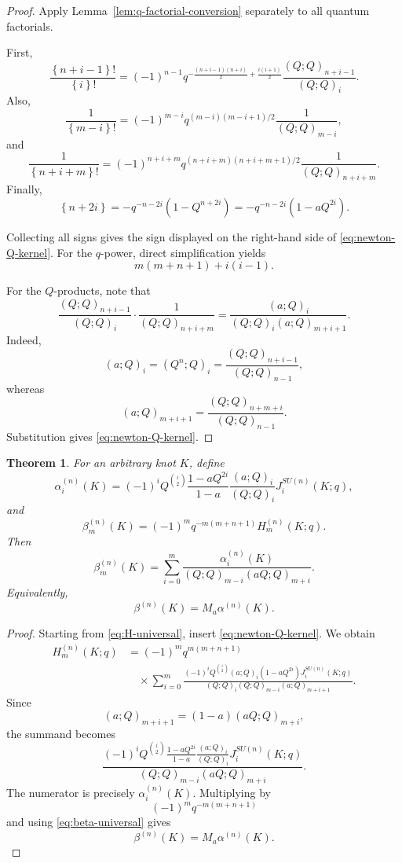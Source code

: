 \documentclass[11pt]{amsart}
\newtheorem{theorem}{Theorem}[section]
\newcommand{\curly}[1]{\left\{#1\right\}}
\begin{document}
\begin{proof}
Apply Lemma~\ref{lem:q-factorial-conversion} separately to all
quantum factorials.

First,
\[
\frac{\curly{n+i-1}!}{\curly{i}!}
=
(-1)^{n-1}
q^{-\frac{(n+i-1)(n+i)}2+\frac{i(i+1)}2}
\frac{(Q;Q)_{n+i-1}}{(Q;Q)_i}.
\]
Also,
\[
\frac{1}{\curly{m-i}!}
=
(-1)^{m-i}
q^{(m-i)(m-i+1)/2}
\frac{1}{(Q;Q)_{m-i}},
\]
and
\[
\frac{1}{\curly{n+i+m}!}
=
(-1)^{n+i+m}
q^{(n+i+m)(n+i+m+1)/2}
\frac{1}{(Q;Q)_{n+i+m}}.
\]
Finally,
\[
\curly{n+2i}
=
-q^{-n-2i}(1-Q^{n+2i})
=
-q^{-n-2i}(1-aQ^{2i}).
\]

Collecting all signs gives the sign displayed on the right-hand side
of \eqref{eq:newton-Q-kernel}.
For the \(q\)-power, direct simplification yields
\[
m(m+n+1)+i(i-1).
\]

For the \(Q\)-products, note that
\[
\frac{(Q;Q)_{n+i-1}}{(Q;Q)_i}
\cdot
\frac{1}{(Q;Q)_{n+i+m}}
=
\frac{(a;Q)_i}{
(Q;Q)_i(a;Q)_{m+i+1}
}.
\]
Indeed,
\[
(a;Q)_i
=
(Q^n;Q)_i
=
\frac{(Q;Q)_{n+i-1}}{(Q;Q)_{n-1}},
\]
whereas
\[
(a;Q)_{m+i+1}
=
\frac{(Q;Q)_{n+m+i}}{(Q;Q)_{n-1}}.
\]
Substitution gives \eqref{eq:newton-Q-kernel}.
\end{proof}

\begin{theorem}\label{thm:universal-bailey}
For an arbitrary knot \(K\), define
\begin{equation}\label{eq:alpha-universal}
\alpha_i^{(n)}(K)
=
(-1)^i
Q^{\binom{i}{2}}
\frac{1-aQ^{2i}}{1-a}
\frac{(a;Q)_i}{(Q;Q)_i}
J_i^{SU(n)}(K;q),
\end{equation}
and
\begin{equation}\label{eq:beta-universal}
\beta_m^{(n)}(K)
=
(-1)^m
q^{-m(m+n+1)}
H_m^{(n)}(K;q).
\end{equation}
Then
\[
\beta_m^{(n)}(K)
=
\sum_{i=0}^{m}
\frac{
\alpha_i^{(n)}(K)
}{
(Q;Q)_{m-i}(aQ;Q)_{m+i}
}.
\]
Equivalently,
\[
\beta^{(n)}(K)
=
M_a\alpha^{(n)}(K).
\]
\end{theorem}

\begin{proof}
Starting from \eqref{eq:H-universal}, insert
\eqref{eq:newton-Q-kernel}.  We obtain
\begin{align*}
H_m^{(n)}(K;q)
&=
(-1)^m
q^{m(m+n+1)}
\\
&\quad\times
\sum_{i=0}^{m}
\frac{
(-1)^iQ^{\binom{i}{2}}
(a;Q)_i(1-aQ^{2i})
J_i^{SU(n)}(K;q)
}{
(Q;Q)_i(Q;Q)_{m-i}(a;Q)_{m+i+1}
}.
\end{align*}
Since
\[
(a;Q)_{m+i+1}
=
(1-a)(aQ;Q)_{m+i},
\]
the summand becomes
\[
\frac{
(-1)^iQ^{\binom{i}{2}}
\frac{1-aQ^{2i}}{1-a}
\frac{(a;Q)_i}{(Q;Q)_i}
J_i^{SU(n)}(K;q)
}{
(Q;Q)_{m-i}(aQ;Q)_{m+i}
}.
\]
The numerator is precisely \(\alpha_i^{(n)}(K)\).
Multiplying by
\[
(-1)^m q^{-m(m+n+1)}
\]
and using \eqref{eq:beta-universal} gives
\[
\beta^{(n)}(K)=M_a\alpha^{(n)}(K).
\]
\end{proof}
\end{document}
